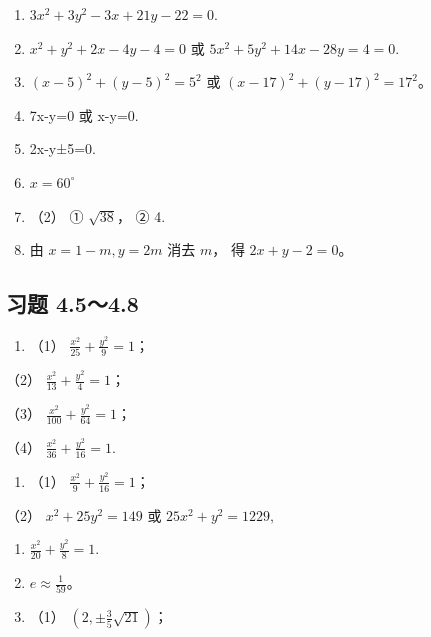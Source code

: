 \begin{enumerate}
\def\labelenumi{\arabic{enumi}.}
\setcounter{enumi}{1}
\item
  \(3x^{2} + 3y^{2} - 3x + 21y - 22 = 0.\)
\item
  \(x^{2} + y^{2} + 2x - 4y - 4 = 0\) 或
  \(5x^{2} + 5y^{2} + 14x - 28y = 4 = 0.\)
\item
  \((x - 5)^{2} + (y - 5)^{2} = 5^{2}\) 或
  \((x - 17)^{2} + (y - 17)^{2} = 17^{2}\)。
\item
  7x-y=0 或 x-y=0.
\item
  2x-y±5=0.
\item
  \(x = 60^{\circ}\)
\item
  （2） ① \(\sqrt{38}\)， ② 4.
\item
  由 \(x = 1 - m, y = 2m\) 消去 \(m\)， 得 \(2x + y - 2 = 0\)。
\end{enumerate}

\subsection{习题 4.5～4.8}\label{ux4e60ux9898-4.54.8}

\begin{enumerate}
\def\labelenumi{\arabic{enumi}.}
\tightlist
\item
  （1） \(\frac{x^2}{25} + \frac{y^2}{9} = 1\)；
\end{enumerate}

（2） \(\frac{x^2}{13} + \frac{y^2}{4} = 1\)；

（3） \(\frac{x^2}{100} + \frac{y^2}{64} = 1\)；

（4） \(\frac{x^2}{36} + \frac{y^2}{16} = 1.\)

\begin{enumerate}
\def\labelenumi{\arabic{enumi}.}
\setcounter{enumi}{1}
\tightlist
\item
  （1） \(\frac{x^2}{9} + \frac{y^2}{16} = 1\)；
\end{enumerate}

（2） \(x^{2} + 25y^{2} = 149\) 或 \(25x^{2} + y^{2} = 1229,\)

\begin{enumerate}
\def\labelenumi{\arabic{enumi}.}
\setcounter{enumi}{2}
\item
  \(\frac{x^2}{20} + \frac{y^2}{8} = 1.\)
\item
  \(e \approx \frac{1}{59}\)。
\item
  （1） \(\left(2, \pm \frac{3}{5}\sqrt{21}\right)\)；
\end{enumerate}

